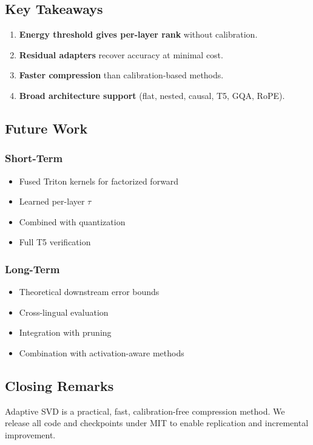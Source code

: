 \subsection{Key Takeaways}

\begin{enumerate}
\item \textbf{Energy threshold gives per-layer rank} without calibration.
\item \textbf{Residual adapters} recover accuracy at minimal cost.
\item \textbf{Faster compression} than calibration-based methods.
\item \textbf{Broad architecture support} (flat, nested, causal, T5, GQA, RoPE).

\end{enumerate}
\subsection{Future Work}

\subsubsection{Short-Term}
\begin{itemize}
\item Fused Triton kernels for factorized forward
\item Learned per-layer $\tau$
\item Combined with quantization
\item Full T5 verification

\end{itemize}
\subsubsection{Long-Term}
\begin{itemize}
\item Theoretical downstream error bounds
\item Cross-lingual evaluation
\item Integration with pruning
\item Combination with activation-aware methods

\end{itemize}
\subsection{Closing Remarks}

Adaptive SVD is a practical, fast, calibration-free compression method. We 
release all code and checkpoints under MIT to enable replication 
and incremental improvement.


